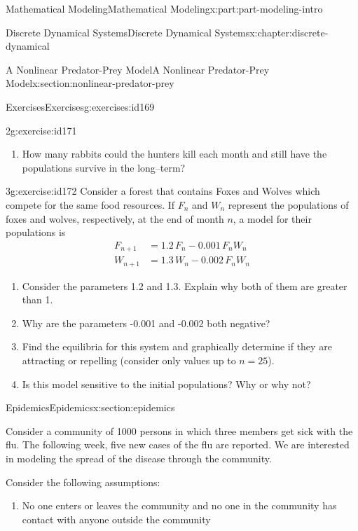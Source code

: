 \documentclass[oneside,10pt,]{book}
\numberwithin{equation}{section}
\newcommand{\amp}{&}
\begin{document}
\begin{partptx}{Mathematical Modeling}{}{Mathematical Modeling}{}{}{x:part:part-modeling-intro}
\begin{chapterptx}{Discrete Dynamical Systems}{}{Discrete Dynamical Systems}{}{}{x:chapter:discrete-dynamical}
\begin{sectionptx}{A Nonlinear Predator-Prey Model}{}{A Nonlinear Predator-Prey Model}{}{}{x:section:nonlinear-predator-prey}
\begin{exercises-subsection-numberless}{Exercises}{}{Exercises}{}{}{g:exercises:id169}
\begin{divisionexercise}{2}{}{}{g:exercise:id171}
\begin{enumerate}[font=\bfseries,label=(\alph*),ref=\alph*]
\item{}How many rabbits could the hunters kill each month and still have the populations survive in the long–term?%
\end{enumerate}
\end{divisionexercise}%
\begin{divisionexercise}{3}{}{}{g:exercise:id172}%
Consider a forest that contains Foxes and Wolves which compete for the same food resources. If \(F_n\) and \(W_n\) represent the populations of foxes and wolves, respectively, at the end of month \(n\), a model for their populations is%
%
\begin{equation*}
\begin{aligned}
F_{n+1} \amp=1.2\,F_n - 0.001\,F_n W_n \\
W_{n+1} \amp=1.3\,W_n - 0.002\,F_n W_n
\end{aligned}
\end{equation*}
\begin{enumerate}[font=\bfseries,label=(\alph*),ref=\alph*]
\item{}Consider the parameters 1.2 and 1.3. Explain why both of them are greater than 1.%
\item{}Why are the parameters -0.001 and -0.002 both negative?%
\item{}Find the equilibria for this system and graphically determine if they are attracting or repelling (consider only values up to \(n = 25\)).%
\item{}Is this model sensitive to the initial populations? Why or why not?%
\end{enumerate}
\end{divisionexercise}%
\end{exercises-subsection-numberless}
\end{sectionptx}
%
%
\typeout{************************************************}
\typeout{************************************************}
%
\begin{sectionptx}{Epidemics}{}{Epidemics}{}{}{x:section:epidemics}
\begin{introduction}{}%
Consider a community of 1000 persons in which three members get sick with the flu. The following week, five new cases of the flu are reported.  We are interested in modeling the spread of the disease through the community.%
\par
Consider the following assumptions:%
%
\begin{enumerate}
\item{}No one enters or leaves the community and no one in the community has contact with anyone outside the community%

\end{enumerate}
\end{introduction}
\end{sectionptx}
\end{chapterptx}
\end{partptx}
\end{document}
